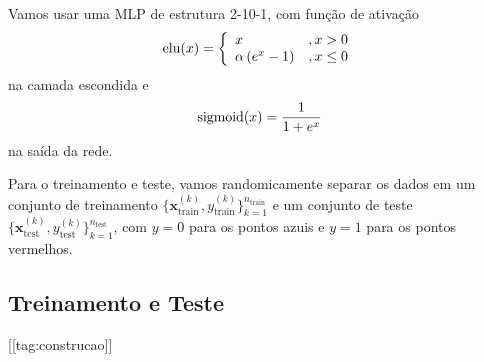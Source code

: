 Vamos usar uma MLP de estrutura 2-10-1, com função de ativação
\begin{equation}
  \operatorname{elu}(x) = \left\{
    \begin{array}{ll}
      x &, x > 0\\
      \alpha\left(e^x - 1\right) &, x \leq 0
    \end{array}
\right.
\end{equation}
na camada escondida e
\begin{equation}
  \operatorname{sigmoid}(x) = \frac{1}{1 + e^x}
\end{equation}
na saída da rede.

Para o treinamento e teste, vamos randomicamente separar os dados em um conjunto de treinamento $\{\pmb{x}_{\text{train}}^{(k)}, y_{\text{train}}^{(k)}\}_{k=1}^{n_{\text{train}}}$ e um conjunto de teste $\{\pmb{x}_{\text{test}}^{(k)}, y_{\text{test}}^{(k)}\}_{k=1}^{n_{\text{test}}}$, com $y=0$ para os pontos azuis e $y=1$ para os pontos vermelhos.

\subsection{Treinamento e Teste}

[[tag:construcao]]

